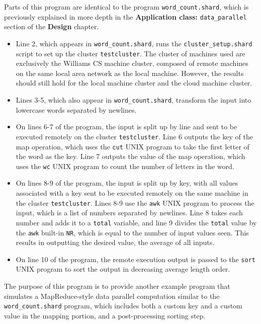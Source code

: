 \documentclass[twoside]{report}
\begin{document}
Parts of this program are identical to the program \texttt{word\_count.shard}, which is previously explained in more depth in the \textbf{Application class: }\texttt{data\_parallel} section of the \textbf{Design} chapter.

\begin{itemize}
  \item
        Line 2, which appears in \texttt{word\_count.shard}, runs the \texttt{cluster\_setup.shard} script to set up the cluster \texttt{testcluster}.
        The cluster of machines used are exclusively the Williams CS machine cluster, composed of remote machines on the same local area network as the local machine. However, the results should still hold for the local machine cluster and the cloud machine cluster.
  \item Lines 3-5, which also appear in \texttt{word\_count.shard}, transform the input into lowercase words separated by newlines.
  \item On lines 6-7 of the program, the input is split up by line and sent to be executed remotely on the cluster \texttt{testcluster}.
        Line 6 outputs the key of the map operation, which uses the \texttt{cut} UNIX program to take the first letter of the word as the key.
        Line 7 outputs the value of the map operation, which uses the \texttt{wc} UNIX program to count the number of letters in the word.
  \item  On lines 8-9 of the program, the input is split up by key, with all values associated with a key sent to be executed remotely on the same machine in the cluster \texttt{testcluster}.
        Lines 8-9 use the \texttt{awk} UNIX program to process the input, which is a list of numbers separated by newlines.
        Line 8 takes each number and adds it to a \texttt{total} variable, and line 9 divides the \texttt{total} value by the \texttt{awk} built-in \texttt{NR}, which is equal to the number of input values seen. This results in outputting the desired value, the average of all inputs.
  \item On line 10 of the program, the remote execution output is passed to the \texttt{sort} UNIX program to sort the output in decreasing average length order.
\end{itemize}
The purpose of this program is to provide another example program that simulates a MapReduce-style data parallel computation similar to the \texttt{word\_count.shard} program, which includes both a custom key and a custom value in the mapping portion, and a post-processing sorting step.
\end{document}
